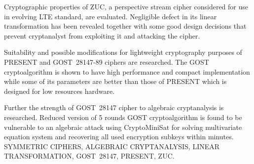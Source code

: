     Cryptographic properties of ZUC, a perspective stream cipher considered
    for use in evolving LTE standard, are evaluated. Negligible defect in its
    linear transformation has been revealed together with some good design
    decisions that prevent cryptanalyst from exploiting it and attacking the cipher.

    Suitability and possible modifications for lightweight cryptography purposes of
    PRESENT and GOST~28147-89 ciphers are researched. The GOST cryptoalgorithm is
    shown to have high performance and compact implementation while some of its
    parameters are better than those of PRESENT which is designed for low resources
    hardware.

    Further the strength of GOST~28147 cipher to algebraic cryptanalysis is
    researched. Reduced version of 5 rounds GOST cryptoalgorithm is found to be
    vulnerable to an algebraic attack using CryptoMiniSat for solving multivariate
    equation system and recovering all used encryption subkeys within minutes. \\[1em]

    SYMMETRIC CIPHERS, ALGEBRAIC CRYPTANALYSIS, LINEAR TRANSFORMATION, GOST~28147,
    PRESENT, ZUC.
\newpage
